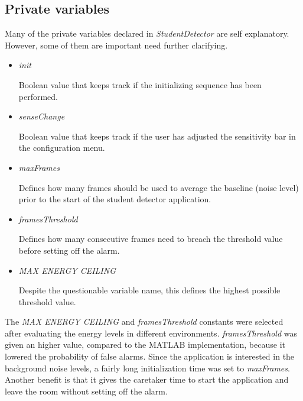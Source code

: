\subsection{Private variables}
Many of the private variables declared in \emph{StudentDetector} are self
explanatory. However, some of them are important  need further clarifying.

\begin{itemize}
\item \emph{init}
	
	Boolean value that keeps track if the initializing sequence has been
	performed.
\item \emph{senseChange}

	Boolean value that keeps track if the user has adjusted the sensitivity
	bar in the configuration menu.
\item \emph{maxFrames}

	Defines how many frames should be used to average the baseline (noise
	level) prior to the start of the student detector application.
\item \emph{framesThreshold}

	Defines how many consecutive frames need to breach the threshold value
	before setting off the alarm.
\item \emph{MAX ENERGY CEILING}
	
	Despite the questionable variable name, this defines the highest
	possible threshold value.
\end{itemize}

The \emph{MAX ENERGY CEILING} and \emph{framesThreshold} constants were selected
after evaluating the energy levels in different environments.
\emph{framesThreshold} was given an higher value, compared to the MATLAB
implementation, because it lowered the probability of false alarms. Since the
application is interested in the background noise levels, a fairly long
initialization time was set to \emph{maxFrames}. Another benefit is that it
gives the caretaker time to start the application and leave the room without
setting off the alarm.

